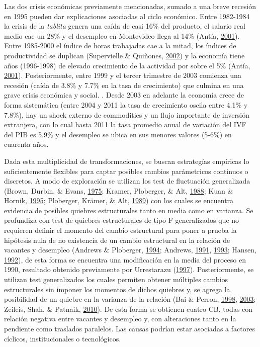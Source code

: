 \documentclass[12pt,oneside]{reedthesis}
\begin{document}
Las dos crisis económicas previamente mencionadas, sumado a una breve recesión en 1995 pueden dar explicaciones asociadas al ciclo económico. Entre 1982-1984 la crisis de la \emph{tablita} genera una caída de casi 16\% del producto, el salario real medio cae un 28\% y el desempleo en Montevideo llega al 14\% (Antía, \protect\hyperlink{ref-Antia2001}{2001}). Entre 1985-2000 el índice de horas trabajadas cae a la mitad, los índices de productividad se duplican (Supervielle \& Quiñones, \protect\hyperlink{ref-Quinones2001}{2002}) y la economía tiene años (1996-1998) de elevado crecimiento de la actividad por sobre el 5\% (Antía, \protect\hyperlink{ref-Antia2001}{2001}). Posteriormente, entre 1999 y el tercer trimestre de 2003 comienza una recesión (caída de 3.8\% y 7.7\% en la tasa de crecimiento) que culmina en una grave crisis económica y social. . Desde 2003 en adelante la economía crece de forma sistemática (entre 2004 y 2011 la tasa de crecimiento oscila entre 4.1\% y 7.8\%), hay un shock externo de commodities y un flujo importante de inversión extranjera, con lo cual hasta 2011 la tasa promedio anual de variación del IVF del PIB es 5.9\% y el desempleo se ubica en sus menores valores (5-6\%) en cuarenta años.

Dada esta multiplicidad de transformaciones, se buscan estrategías empíricas lo suficientemente flexibles para captar posibles cambios parámetricos continuos o discretos. A modo de exploración se utilizan los test de fluctuación generalizada (Brown, Durbin, \& Evans, \protect\hyperlink{ref-Brown1975}{1975}; Kramer, Ploberger, \& Alt, \protect\hyperlink{ref-Society1988}{1988}; Kuan \& Hornik, \protect\hyperlink{ref-Kuan1995}{1995}; Ploberger, Krämer, \& Alt, \protect\hyperlink{ref-Ploberger1989}{1989}) con los cuales se encuentra evidencia de posibles quiebres estructurales tanto en media como en varianza. Se profundiza con test de quiebres estructurales de tipo F generalizados que no requieren definir el momento del cambio estructural para poner a prueba la hipótesis nula de no existencia de un cambio estructural en la relación de vacantes y desempleo (Andrews \& Ploberger, \protect\hyperlink{ref-Andrews1994}{1994}; Andrews, \protect\hyperlink{ref-Andrews1991}{1991}, \protect\hyperlink{ref-Andrews1993}{1993}; Hansen, \protect\hyperlink{ref-Hansen1992}{1992}), de esta forma se encuentra una modificación en la media del proceso en 1990, resultado obtenido previamente por Urrestarazu (\protect\hyperlink{ref-Urrestarazu1997}{1997}). Posteriormente, se utilizan test generalizados los cuales permiten obtener múltiples cambios estructurales sin imponer los momentos de dichos quiebres y, se agrega la posibilidad de un quiebre en la varianza de la relación (Bai \& Perron, \protect\hyperlink{ref-BaiPerron1998}{1998}, \protect\hyperlink{ref-BaiPerron2003}{2003}; Zeileis, Shah, \& Patnaik, \protect\hyperlink{ref-Zeileis2010}{2010}). De esta forma se obtienen cuatro CB, todas con relación negativa entre vacantes y desempleo y, con alteraciones tanto en la pendiente como traslados paralelos. Las causas podrían estar asociadas a factores cíclicos, institucionales o tecnológicos.
\end{document}
